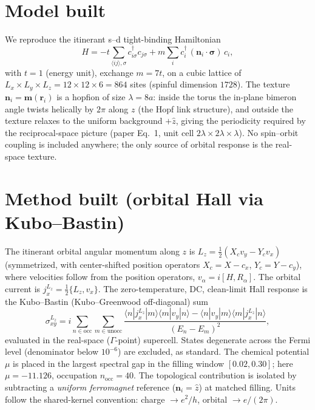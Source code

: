 \documentclass[11pt]{article}
\begin{document}
\section{Model built}
We reproduce the itinerant s--d tight-binding Hamiltonian
\begin{equation}
H = -t\sum_{\langle ij\rangle,\sigma} c^\dagger_{i\sigma}c_{j\sigma}
    + m\sum_i c^\dagger_i\,(\mathbf n_i\cdot\boldsymbol\sigma)\,c_i ,
\end{equation}
with $t=1$ (energy unit), exchange $m=7t$, on a cubic lattice of $L_x\times L_y\times
L_z = 12\times12\times6=864$ sites (spinful dimension $1728$). The texture
$\mathbf n_i=\mathbf m(\mathbf r_i)$ is a hopfion of size $\lambda=8a$: inside the
torus the in-plane bimeron angle twists helically by $2\pi$ along $z$ (the Hopf link
structure), and outside the texture relaxes to the uniform background $+\hat z$, giving
the periodicity required by the reciprocal-space picture (paper Eq.~1, unit cell
$2\lambda\times2\lambda\times\lambda$). No spin--orbit coupling is included anywhere;
the only source of orbital response is the real-space texture.

\section{Method built (orbital Hall via Kubo--Bastin)}
The itinerant orbital angular momentum along $z$ is
$L_z=\tfrac12(X_c v_y - Y_c v_x)$ (symmetrized, with center-shifted position
operators $X_c=X-c_x$, $Y_c=Y-c_y$), where velocities follow from the position
operators, $v_\alpha = i[H,R_\alpha]$. The orbital current is
$j^{L_z}_x=\tfrac12\{L_z,v_x\}$. The zero-temperature, DC, clean-limit Hall response is
the Kubo--Bastin (Kubo--Greenwood off-diagonal) sum
\begin{equation}
\sigma^{L_z}_{xy}
= i\sum_{n\in\text{occ}}\sum_{m\in\text{unocc}}
\frac{\langle n|j^{L_z}_x|m\rangle\langle m|v_y|n\rangle
     -\langle n|v_y|m\rangle\langle m|j^{L_z}_x|n\rangle}{(E_n-E_m)^2},
\end{equation}
evaluated in the real-space ($\Gamma$-point) supercell. States degenerate across the
Fermi level (denominator below $10^{-6}$) are excluded, as standard. The chemical
potential $\mu$ is placed in the largest spectral gap in the filling window
$[0.02,0.30]$; here $\mu=-11.126$, occupation $n_{\text{occ}}=40$. The topological
contribution is isolated by subtracting a \emph{uniform ferromagnet} reference
($\mathbf n_i=\hat z$) at matched filling. Units follow the shared-kernel convention:
charge $\to e^2/h$, orbital $\to e/(2\pi)$.
\end{document}
